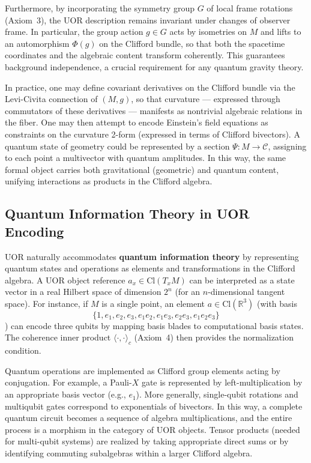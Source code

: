 \documentclass[12pt]{article}
\begin{document}
Furthermore, by incorporating the symmetry group $G$ of local frame rotations (Axiom~3), the UOR description remains invariant under changes of observer frame. In particular, the group action $g \in G$ acts by isometries on $M$ and lifts to an automorphism $\Phi(g)$ on the Clifford bundle, so that both the spacetime coordinates and the algebraic content transform coherently. This guarantees background independence, a crucial requirement for any quantum gravity theory.

In practice, one may define covariant derivatives on the Clifford bundle via the Levi-Civita connection of $(M,g)$, so that curvature --- expressed through commutators of these derivatives --- manifests as nontrivial algebraic relations in the fiber. One may then attempt to encode Einstein's field equations as constraints on the curvature 2-form (expressed in terms of Clifford bivectors). A quantum state of geometry could be represented by a section $\Psi : M \to \mathcal{C}$, assigning to each point a multivector with quantum amplitudes. In this way, the same formal object carries both gravitational (geometric) and quantum content, unifying interactions as products in the Clifford algebra.

\subsection{Quantum Information Theory in UOR Encoding}
UOR naturally accommodates \textbf{quantum information theory} by representing quantum states and operations as elements and transformations in the Clifford algebra. A UOR object reference $a_x \in \mathrm{Cl}(T_x M)$ can be interpreted as a state vector in a real Hilbert space of dimension $2^n$ (for an $n$-dimensional tangent space). For instance, if $M$ is a single point, an element $a \in \mathrm{Cl}(\mathbb{R}^3)$ (with basis 
\[
\{1, e_1, e_2, e_3, e_1e_2, e_1e_3, e_2e_3, e_1e_2e_3\}
\]
) can encode three qubits by mapping basis blades to computational basis states. The coherence inner product $\langle \cdot, \cdot \rangle_c$ (Axiom~4) then provides the normalization condition.

Quantum operations are implemented as Clifford group elements acting by conjugation. For example, a Pauli-$X$ gate is represented by left-multiplication by an appropriate basis vector (e.g., $e_1$). More generally, single-qubit rotations and multiqubit gates correspond to exponentials of bivectors. In this way, a complete quantum circuit becomes a sequence of algebra multiplications, and the entire process is a morphism in the category of UOR objects. Tensor products (needed for multi-qubit systems) are realized by taking appropriate direct sums or by identifying commuting subalgebras within a larger Clifford algebra.
\end{document}
